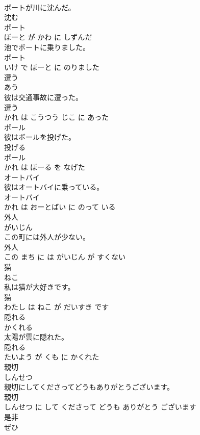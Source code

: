 \documentclass[8pt]{extreport}
\begin{document}
\begin{CJK}{UTF8}{min}
\\	ボートが川に沈んだ。	
\\	沈む 
\\	ボート 
\\	ぼーと が かわ に しずんだ			
\\	池でボートに乗りました。	
\\	ボート 
\\	いけ で ぼーと に のりました			
\\	遭う	
\\	あう			
\\	彼は交通事故に遭った。	
\\	遭う 
\\	かれ は こうつう じこ に あった			
\\	ボール	
\\	彼はボールを投げた。	
\\	投げる 
\\	ボール 
\\	かれ は ぼーる を なげた			
\\	オートバイ	
\\	彼はオートバイに乗っている。	
\\	オートバイ 
\\	かれ は おーとばい に のって いる			
\\	外人	
\\	がいじん			
\\	この町には外人が少ない。	
\\	外人 
\\	この まち に は がいじん が すくない			
\\	猫	
\\	ねこ			
\\	私は猫が大好きです。	
\\	猫 
\\	わたし は ねこ が だいすき です			
\\	隠れる	
\\	かくれる			
\\	太陽が雲に隠れた。	
\\	隠れる 
\\	たいよう が くも に かくれた			
\\	親切	
\\	しんせつ			
\\	親切にしてくださってどうもありがとうございます。	
\\	親切 
\\	しんせつ に して くださって どうも ありがとう ございます			
\\	是非	
\\	ぜひ			

\end{CJK}
\end{document}
